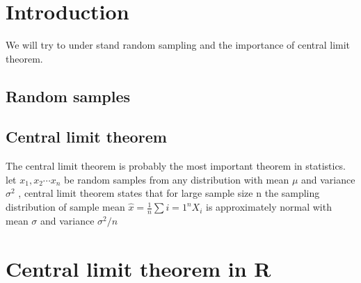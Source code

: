 \documentclass["../Applied_probabillity _and_statistics_lab_KTU.tex"]{subfiles}
\begin{document}
  \section{Introduction}
   We will try to under stand random sampling and the importance of central limit theorem.
   
   \subsection{Random samples}
   \subsection{Central limit theorem}
   The  central limit theorem is probably the most important theorem in statistics. let $x_1,x_2\cdots x_n$ be random samples from any distribution with mean $\mu$ and variance $\sigma ^2$ , central limit theorem states that  for large sample size n the sampling distribution of sample mean $\hat{x} = \frac{1}{n}\sum{i=1}^{n} X_i$ is approximately normal with mean $\sigma$ and variance $\sigma^2 / n$ 
   \section{Central limit theorem in R}
\end{document}
